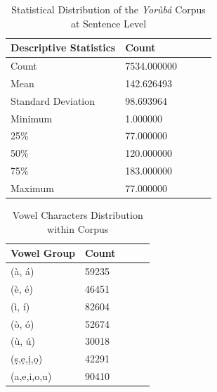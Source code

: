 \documentclass[review]{elsarticle}
\newcommand{\yor}{\textit{Yor\`ub\'a }}
\begin{document}
\begin{table}[h]
	\centering
	{\caption{Statistical Distribution of the \yor Corpus at Sentence Level}\label{utterance structure} \smallskip}
	\begin{tabular}{l p{2.5cm} p{2.0cm} p{2.0cm} r}\toprule[0.01cm]
		Descriptive Statistics & Count  \bigstrut \\[2ex] \toprule[0.01cm]
		Count & 7534.000000 \bigstrut \\[2ex]
		Mean & 142.626493 \bigstrut \\[2ex]
		Standard Deviation  & 98.693964\bigstrut \\[2ex]
		Minimum  &  1.000000\bigstrut \\[2ex]
		25\%  &  77.000000\bigstrut \\[2ex]
		50\%  & 120.000000\bigstrut \\[2ex]
		75\%  &  183.000000\bigstrut \\[2ex]
		Maximum  &  77.000000\bigstrut \\[2ex]
		\hline
	\end{tabular}
\end{table}


\begin{table} [H]
	\centering
	{\caption{Vowel Characters Distribution within Corpus}\label{utterance structure} \smallskip}
	\begin{tabular}{l p{2.5cm} p{2.0cm} p{2.0cm} r}\toprule[0.01cm]
		Vowel Group & Count  \bigstrut \\[2ex] \toprule[0.01cm]
		(\`a, \'a) & 59235 \bigstrut \\[2ex]
		(\`e, \'e) & 46451 \bigstrut \\[2ex]
		(\`i, \'i)  & 82604\bigstrut \\[2ex]
		(\`o, \'o)  &  52674 \bigstrut \\[2ex]
		(\`u, \'u)  &  30018 \bigstrut \\[2ex]
		(\d{s},\d{e},\d{i},\d{o})  & 42291\bigstrut \\[2ex]
		(a,e,i,o,u)  &  90410 \bigstrut \\[2ex]
		\hline
	\end{tabular}
\end{table}
\end{document}
